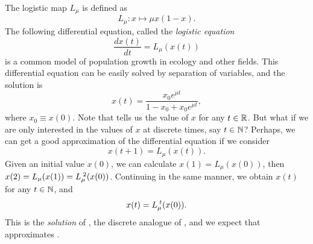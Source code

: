 \documentclass[10pt,twoside,draft]{book}
\begin{document}
The logistic map $L_\mu$ is defined as 
\begin{equation*}
  L_{\mu}: x \mapsto \mu x(1-x).
\end{equation*}
The following differential equation, called the \textit{logistic equation}
\begin{equation}
  \frac{dx(t)}{dt} = L_{\mu}(x(t))
  \label{eqn:lde}
\end{equation}
is a common model of population growth in ecology and other fields.
This differential equation can be easily solved by separation of variables, and the solution is
\begin{equation}
  x(t) = \frac{x_0 e^{\mu t}}{1 - x_0 + x_0 e^{\mu t}},
  \label{eqn:ldesoln}
\end{equation}
where $x_0 \equiv x(0)$.
Note that  tells us the value of $x$ for any $t \in \mathbb{R}$.
But what if we are only interested in the values of $x$ at discrete times, say $t \in \mathbb{N}$?
Perhaps, we can get a good approximation of the differential equation if we consider
\begin{equation}
  x(t + 1) = L_{\mu}(x(t)).
  \label{eqn:logistic}
\end{equation}
Given an initial value $x(0)$, we can calculate $x(1) = L_\mu(x(0))$, then $x(2) = L_\mu(x(1)) = L_\mu^{\;2}(x(0))$.
Continuing in the same manner, we obtain $x(t)$ for any $t \in \mathbb{N}$, and 
\begin{equation}
  x(t) = L_\mu^{\;t}(x(0)).
  \label{eqn:logisticsoln}
\end{equation}
This is the \textit{solution} of , the discrete analogue of , and we expect that  approximates .
\end{document}
